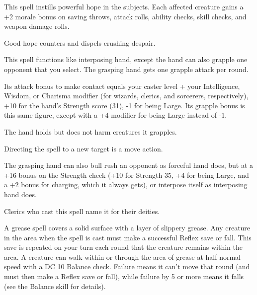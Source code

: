 \begin{multicols}{2}
\begin{small}
\noindent This spell instills powerful hope in the subjects. Each affected creature gains a +2 morale bonus on saving throws, attack rolls, ability checks, skill checks, and weapon damage rolls.

\smallskip\noindent Good hope counters and dispels crushing despair.

\noindent This spell functions like interposing hand, except the hand can also grapple one opponent that you select. The grasping hand gets one grapple attack per round.

\smallskip\noindent Its attack bonus to make contact equals your caster level + your Intelligence, Wisdom, or Charisma modifier (for wizards, clerics, and sorcerers, respectively), +10 for the hand's Strength score (31), -1 for being Large. Its grapple bonus is this same figure, except with a +4 modifier for being Large instead of -1. 

\smallskip\noindent The hand holds but does not harm creatures it grapples.

\smallskip\noindent Directing the spell to a new target is a move action.

\smallskip\noindent The grasping hand can also bull rush an opponent as forceful hand does, but at a +16 bonus on the Strength check (+10 for Strength 35, +4 for being Large, and a +2 bonus for charging, which it always gets), or interpose itself as interposing hand does.

\smallskip\noindent Clerics who cast this spell name it for their deities.


\noindent A grease spell covers a solid surface with a layer of slippery grease. Any creature in the area when the spell is cast must make a successful Reflex save or fall. This save is repeated on your turn each round that the creature remains within the area. A creature can walk within or through the area of grease at half normal speed with a DC 10 Balance check. Failure means it can't move that round (and must then make a Reflex save or fall), while failure by 5 or more means it falls (see the Balance skill for details).


\end{small}
\end{multicols}
